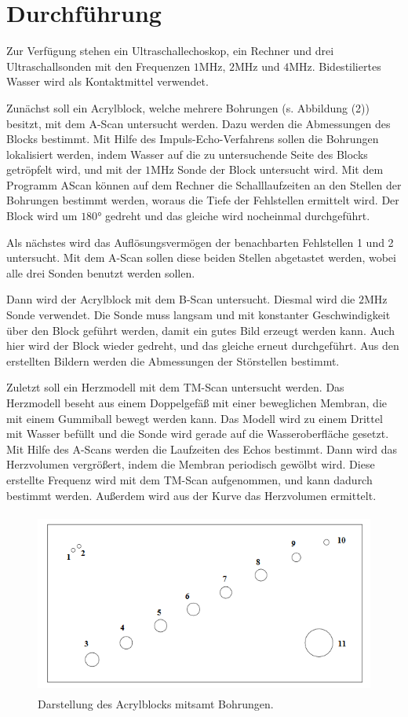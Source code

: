 \section{Durchführung}
\label{sec:Durchführung}

Zur Verfügung stehen ein Ultraschallechoskop, ein Rechner und drei Ultraschallsonden mit den Frequenzen $1 \si{\mega\hertz}$, $2 \si{\mega\hertz}$ und $4 \si{\mega\hertz}$.
Bidestiliertes Wasser wird als Kontaktmittel verwendet. 

Zunächst soll ein Acrylblock, welche mehrere Bohrungen (s. Abbildung (2)) besitzt, mit dem A-Scan untersucht werden. Dazu werden die Abmessungen des Blocks bestimmt.
Mit Hilfe des Impuls-Echo-Verfahrens sollen die Bohrungen lokalisiert werden, indem Wasser auf die zu untersuchende Seite des Blocks getröpfelt wird, und mit der $1 \si{\mega\hertz}$ Sonde der Block untersucht wird.
Mit dem Programm AScan können auf dem Rechner die Schalllaufzeiten an den Stellen der Bohrungen bestimmt werden, woraus die Tiefe der Fehlstellen ermittelt wird.
Der Block wird um $180°$ gedreht und das gleiche wird nocheinmal durchgeführt.

Als nächstes wird das Auflösungsvermögen der benachbarten Fehlstellen 1 und 2 untersucht. Mit dem A-Scan sollen diese beiden Stellen abgetastet werden, wobei alle drei Sonden benutzt werden sollen.

Dann wird der Acrylblock mit dem B-Scan untersucht. Diesmal wird die $2 \si{\mega\hertz}$ Sonde verwendet. Die Sonde muss langsam und mit konstanter Geschwindigkeit über den Block geführt werden, damit ein gutes Bild erzeugt werden kann.
Auch hier wird der Block wieder gedreht, und das gleiche erneut durchgeführt. Aus den erstellten Bildern werden die Abmessungen der Störstellen bestimmt.

Zuletzt soll ein Herzmodell mit dem TM-Scan untersucht werden. Das Herzmodell beseht aus einem Doppelgefäß mit einer beweglichen Membran, die mit einem Gummiball bewegt werden kann.
Das Modell wird zu einem Drittel mit Wasser befüllt und die Sonde wird gerade auf die Wasseroberfläche gesetzt. Mit Hilfe des A-Scans werden die Laufzeiten des Echos bestimmt.
Dann wird das Herzvolumen vergrößert, indem die Membran periodisch gewölbt wird.
Diese erstellte Frequenz wird mit dem TM-Scan aufgenommen, und kann dadurch bestimmt werden. Außerdem wird aus der Kurve das Herzvolumen ermittelt.
\begin{figure}[H]
  \centering
  \includegraphics[height=6cm]{acryl.png}
  \caption{Darstellung des Acrylblocks mitsamt Bohrungen. \cite[S.4]{kent}}
\end{figure}
